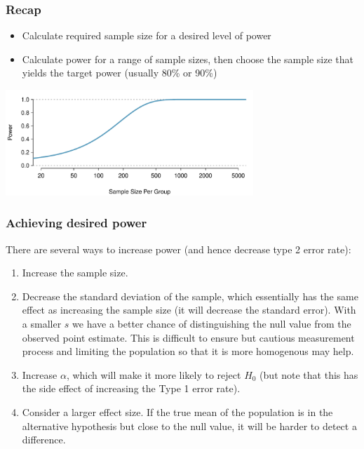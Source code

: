 
\begin{frame}
\frametitle{Recap}

\begin{itemize}
\item Calculate required sample size for a desired level of power
\item Calculate power for a range of sample sizes, then choose the sample size that yields the target power (usually 80\% or 90\%)
\end{itemize}
\begin{center}
\includegraphics[width=0.7\textwidth]{7-4_power/figures/power/power_curve_neg-3}
\end{center}

\end{frame}


\begin{frame}
\frametitle{Achieving desired power}

There are several ways to increase power (and hence decrease type 2 error rate):

\pause

{\small
\begin{enumerate}

\item Increase the sample size.

\pause

\item Decrease the standard deviation of the sample, which essentially has the same effect as increasing the sample size (it will decrease the standard error). With a smaller $s$ we have a better chance of distinguishing the null value from the observed point estimate. This is difficult to ensure but cautious measurement process and limiting the population so that it is more homogenous may help.

\pause

\item Increase $\alpha$, which will make it more likely to reject $H_0$ (but note that this has the side effect of increasing the Type 1 error rate).

\pause

\item Consider a larger effect size. If the true mean of the population is in the alternative hypothesis but close to the null value, it will be harder to detect a difference.

\end{enumerate}
}

\end{frame}

